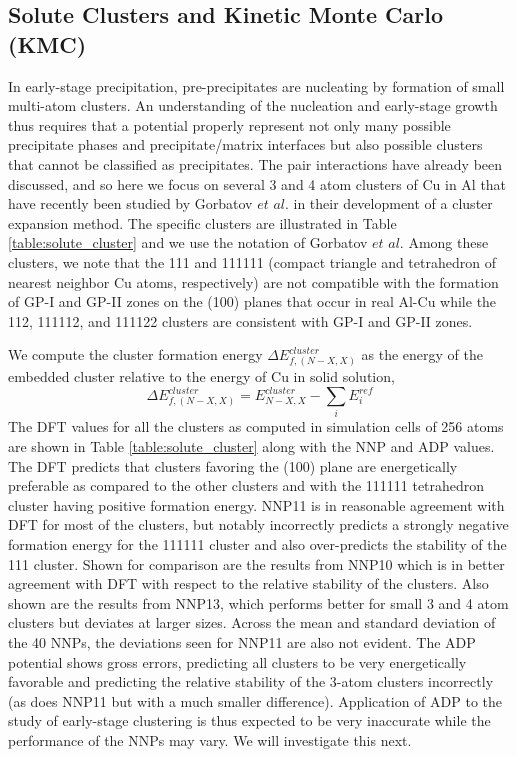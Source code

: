 \documentclass{article}
\begin{document}
\subsection{Solute Clusters and Kinetic Monte Carlo (KMC)} \label{sct:solute_clusters_KMC}

In early-stage precipitation, pre-precipitates are nucleating by formation of small multi-atom clusters.  An understanding of the nucleation and early-stage growth thus requires that a potential properly represent not only many possible precipitate phases and precipitate/matrix interfaces but also possible clusters that cannot be classified as precipitates.  The pair interactions have already been discussed, and so here we focus on several 3 and 4 atom clusters of Cu in Al that have recently been studied by Gorbatov $\textit{et al.}$\cite{Gorbatov2019EffectiveAlloys} in their development of a cluster expansion method.  The specific clusters are illustrated in Table \ref{table:solute_cluster} and we use the notation of Gorbatov $\textit{et al}$.  Among these clusters, we note that the 111 and 111111 (compact triangle and tetrahedron of nearest neighbor Cu atoms, respectively) are not compatible with the formation of GP-I and GP-II zones on the (100) planes that occur in real Al-Cu while the 112, 111112, and 111122 clusters are consistent with GP-I and GP-II zones.

We compute the cluster formation energy $\Delta E^{cluster}_{f,(N-X,X)}$ as the energy of the embedded cluster relative to the energy of Cu in solid solution,
\begin{equation}
\Delta E^{cluster}_{f,(N-X,X)} = E^{cluster}_{N-X,X} - \sum_i E^{ref}_i
\end{equation}
The DFT values for all the clusters as computed in simulation cells of 256 atoms are shown in Table \ref{table:solute_cluster} along with the NNP and ADP values.  The DFT predicts that clusters favoring the (100) plane are energetically preferable as compared to the other clusters and with the 111111 tetrahedron cluster having positive formation energy.  NNP11 is in reasonable agreement with DFT for most of the clusters, but notably incorrectly predicts a strongly negative formation energy for the 111111 cluster and also over-predicts the stability of the 111 cluster. Shown for comparison are the results from NNP10 which is in better agreement with DFT with respect to the relative stability of the clusters. Also shown are the results from NNP13, which performs better for small 3 and 4 atom clusters but deviates at larger sizes.  Across the mean and standard deviation of the 40 NNPs, the deviations seen for NNP11 are also not evident. The ADP potential shows gross errors, predicting all clusters to be very energetically favorable and predicting the relative stability of the 3-atom clusters incorrectly (as does NNP11 but with a much smaller difference).  Application of ADP to the study of early-stage clustering is thus expected to be very inaccurate while the performance of the NNPs may vary.  We will investigate this next.
\end{document}
